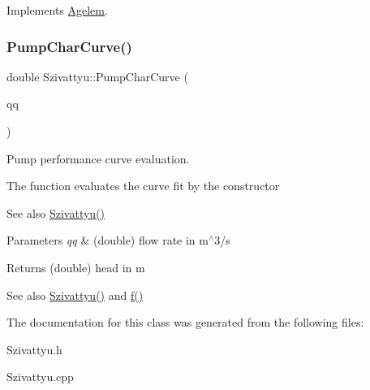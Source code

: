 Implements \hyperlink{class_agelem_aa1d93be52ddae11df003c4e35c47084b}{Agelem}.

\hypertarget{class_szivattyu_ad2fec54e4e5cb236bc7b6a3e8dfbed2f}{}\label{class_szivattyu_ad2fec54e4e5cb236bc7b6a3e8dfbed2f} 
\subsubsection{\texorpdfstring{Pump\+Char\+Curve()}{PumpCharCurve()}}
{\footnotesize\ttfamily double Szivattyu\+::\+Pump\+Char\+Curve (\begin{DoxyParamCaption}\item[{double}]{qq }\end{DoxyParamCaption})}



Pump performance curve evaluation. 

The function evaluates the curve fit by the constructor \begin{DoxySeeAlso}{See also}
\hyperlink{class_szivattyu}{Szivattyu()} 
\end{DoxySeeAlso}

\begin{DoxyParams}{Parameters}
{\em qq} & (double) flow rate in m$^\wedge$3/s \\
\hline
\end{DoxyParams}
\begin{DoxyReturn}{Returns}
(double) head in m 
\end{DoxyReturn}
\begin{DoxySeeAlso}{See also}
\hyperlink{class_szivattyu}{Szivattyu()} and \hyperlink{class_szivattyu_a083379e0cee2db17f1b20db3fdfcde79}{f()} 
\end{DoxySeeAlso}


The documentation for this class was generated from the following files\+:\begin{DoxyCompactItemize}
\item 
Szivattyu.\+h\item 
Szivattyu.\+cpp\end{DoxyCompactItemize}
